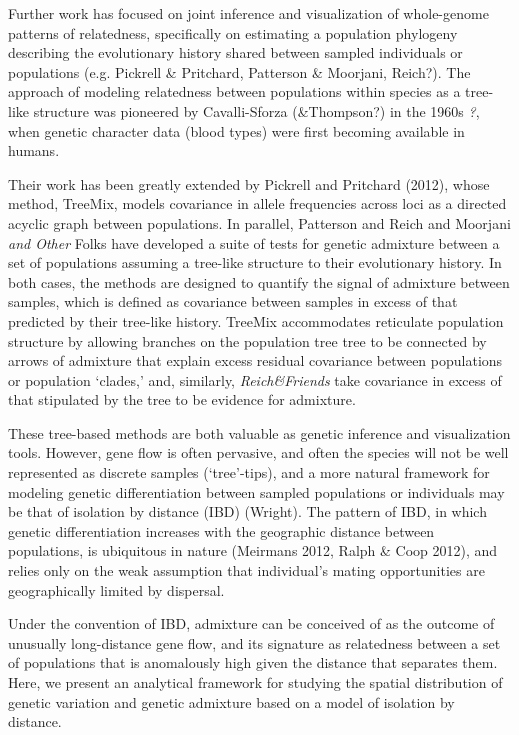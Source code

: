 \documentclass[12pt]{article}
\newcommand{\gb}[1]{{\em \color{magenta} #1}}
\begin{document}
Further work has focused on joint inference and visualization of whole-genome patterns of relatedness, specifically on estimating a population phylogeny describing the evolutionary history shared between sampled individuals or populations (e.g. Pickrell \& Pritchard, Patterson \& Moorjani, Reich?).  The approach of modeling relatedness between populations within species as a tree-like structure was pioneered by Cavalli-Sforza (\&Thompson?) in the 1960s \gb{?}, when genetic character data (blood types) were first becoming available in humans.  

Their work has been greatly extended by Pickrell and Pritchard (2012), whose method, TreeMix, models covariance in allele frequencies across loci as a directed acyclic graph between populations.  In parallel, Patterson and Reich and Moorjani \gb{and Other} Folks have developed a suite of tests for genetic admixture between a set of populations assuming a tree-like structure to their evolutionary history. In both cases, the methods are designed to quantify the signal of admixture between samples, which is defined as covariance between samples in excess of that predicted by their tree-like history.  TreeMix accommodates reticulate population structure by allowing branches on the population tree tree to be connected by arrows of admixture that explain excess residual covariance between populations or population `clades,' and, similarly, \gb{Reich\&Friends} take covariance in excess of that stipulated by the tree to be evidence for admixture.

These tree-based methods are both valuable as genetic inference and visualization tools.  However, gene flow is often pervasive, and often the 
species will not be well represented as discrete samples (`tree'-tips), and a more natural framework for modeling genetic differentiation between sampled populations or individuals may be that of isolation by distance (IBD) (Wright).  The pattern of IBD, in which genetic differentiation increases with the geographic distance between populations, is ubiquitous in nature (Meirmans 2012, Ralph \& Coop 2012), and relies only on the weak assumption that individual's mating opportunities are geographically limited by dispersal.



Under the convention of IBD, admixture can be conceived of as the outcome of unusually long-distance gene flow, and its signature as relatedness between a set of populations that is anomalously high given the distance that separates them.  Here, we present an analytical framework for studying the spatial distribution of genetic variation and genetic admixture based on a model of isolation by distance.
\end{document}
